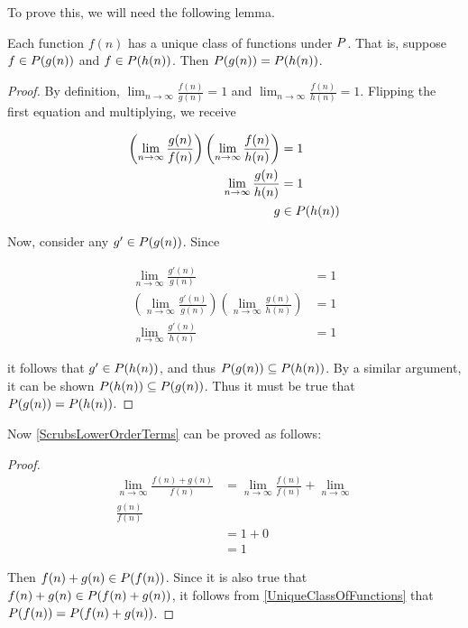 To prove this, we will need the following lemma.

\begin{lemma}
\label{UniqueClassOfFunctions}
	Each function $f(n)$ has a unique class of functions under $P$. That is, suppose $f \in P(g(n))$ and $f \in P(h(n))$. Then $P(g(n)) = P(h(n))$.
\end{lemma}

\begin{proof}
	By definition, $\lim_{n \to \infty} \frac{f(n)}{g(n)} = 1$ and $\lim_{n \to \infty} \frac{f(n)}{h(n)} = 1$. Flipping the first equation and multiplying, we receive
	
	\begin{align*}
	\left( \lim_{n \to \infty} \frac {g(n)} {f(n)} \right) \left( \lim_{n \to \infty} \frac {f(n)} {h(n)} \right) &= 1\\
	\lim_{n \to \infty} \frac {g(n)} {h(n)} &= 1\\
	g &\in P(h(n))
	\end{align*}
	
	Now, consider any $g' \in P(g(n))$. Since
	
	\begin{align*}
	\lim_{n \to \infty} \frac {g'(n)} {g(n)} &= 1\\
	\left( \lim_{n \to \infty} \frac {g'(n)} {g(n)} \right) \left( \lim_{n \to \infty} \frac{g(n)}{h(n)} \right) &= 1\\
	\lim_{n \to \infty} \frac{g'(n)}{h(n)} &= 1
	\end{align*}
	
	it follows that $g' \in P(h(n))$, and thus $P(g(n)) \subseteq P(h(n))$. By a similar argument, it can be shown $P(h(n)) \subseteq P(g(n))$. Thus it must be true that $P(g(n)) = P(h(n))$.
\end{proof}

Now \ref{ScrubsLowerOrderTerms} can be proved as follows:

\begin{proof}
	\begin{align*}
		\lim_{n \to \infty} \frac{f(n) + g(n)}{f(n)} &= \lim_{n \to \infty} \frac{f(n)}{f(n)} + \lim_{n \to \infty}\\ \frac{g(n)}{f(n)}\\
		&= 1 + 0\\
		&= 1
	\end{align*}
	
	Then $f(n) + g(n) \in P(f(n))$. Since it is also true that $f(n) + g(n) \in P(f(n) + g(n))$, it follows from \ref{UniqueClassOfFunctions} that $P(f(n)) = P(f(n) + g(n))$.
\end{proof}

